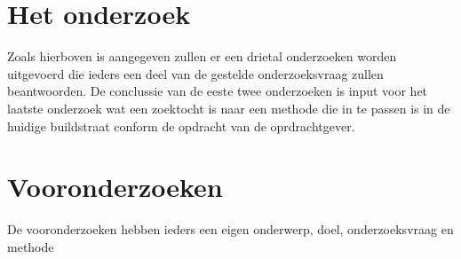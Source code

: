 \section{Het onderzoek}\label{sec:methodeonderzoek}
Zoals hierboven is aangegeven zullen er een drietal onderzoeken worden uitgevoerd die ieders een deel van de gestelde onderzoeksvraag zullen beantwoorden. De conclussie van de eeste twee onderzoeken is input voor het laatste onderzoek wat een zoektocht is naar een methode die in te passen is in de huidige buildstraat conform de opdracht van de oprdrachtgever.
\section{Vooronderzoeken}\label{sec:vooronderzoeken}
De vooronderzoeken hebben ieders een eigen onderwerp, doel, onderzoeksvraag en methode
